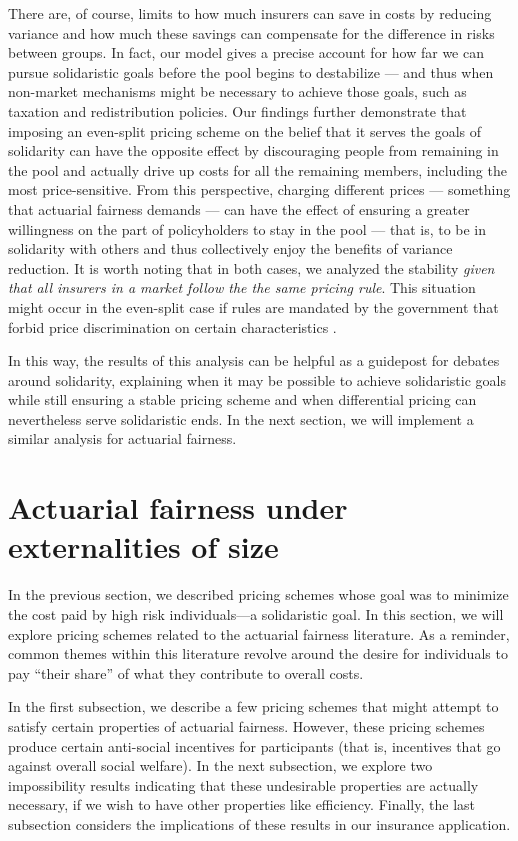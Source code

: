\documentclass[sigconf]{acmart}
\begin{document}
There are, of course, limits to how much insurers can save in costs by reducing variance and how much these savings can compensate for the difference in risks between groups. In fact, our model gives a precise account for how far we can pursue solidaristic goals before the pool begins to destabilize --- and thus when non-market mechanisms might be necessary to achieve those goals, such as taxation and redistribution policies. Our findings further demonstrate that imposing an even-split pricing scheme on the belief that it serves the goals of solidarity can have the opposite effect by discouraging people from remaining in the pool and actually drive up costs for all the remaining members, including the most price-sensitive. From this perspective, charging different prices --- something that actuarial fairness demands --- can have the effect of ensuring a greater willingness on the part of policyholders to stay in the pool --- that is, to be in solidarity with others and thus collectively enjoy the benefits of variance reduction. It is worth noting that in both cases, we analyzed the stability \emph{given that all insurers in a market follow the the same pricing rule}. This situation might occur in the even-split case if rules are mandated by the government that forbid price discrimination on certain characteristics \cite{avraham2014understanding}.

In this way, the results of this analysis can be helpful as a guidepost for debates around solidarity, explaining when it may be possible to achieve solidaristic goals while still ensuring a stable pricing scheme and when differential pricing can nevertheless serve solidaristic ends. In the next section, we will implement a similar analysis for actuarial fairness. 


\section{Actuarial fairness under externalities of size}\label{Actfair}
In the previous section, we described pricing schemes whose goal was to minimize the cost paid by high risk individuals---a solidaristic goal. In this section, we will explore pricing schemes related to the actuarial fairness literature. As a reminder, common themes within this literature revolve around the desire for individuals to pay \enquote{their share} of what they contribute to overall costs. 

In the first subsection, we describe a few pricing schemes that might attempt to satisfy certain properties of actuarial fairness. However, these pricing schemes produce certain anti-social incentives for participants (that is, incentives that go against overall social welfare). In the next subsection, we explore two impossibility results indicating that these undesirable properties are actually necessary, if we wish to have other properties like efficiency. Finally, the last subsection considers the implications of these results in our insurance application.  
\end{document}

